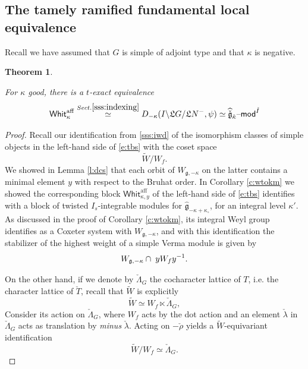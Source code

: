 \documentclass[11pt,reqno]{amsart}
\newcommand{\cgk}{\widehat{\check{\mathfrak{g}}}_{\check{\kappa}}}
\newcommand{\aff}{\operatorname{aff}}
\newcommand{\fL}{\mathfrak{L}}
\newcommand{\fg}{\mathfrak{g}}
\newtheorem{theo}[subsubsection]{Theorem}
\theoremstyle{remark}
\numberwithin{equation}{section}
\renewcommand{\mod}{\text{\textendash}\mathsf{mod}}
\newcommand{\Whit}{\mathsf{Whit}}
\begin{document}
\subsection{The tamely ramified fundamental local equivalence}
Recall we have assumed that $G$ is simple of adjoint type and that $\kappa$ is negative. 
\begin{theo}\label{t:fle-tame} 

For $\kappa$ good, there is a $t$-exact equivalence
	\begin{equation} \label{e:tbs} 
	\Whit_{\kappa}^{\aff} 
	\overset{Sect. \ref{sss:indexing}}{\simeq} 
	D_{-\kappa}(I \backslash \fL G / 
	\fL N^-, \psi) \simeq 
	\cgk\mod^{\check{I}} 
	\end{equation}
	\end{theo}
\begin{proof} Recall 
	our identification from \ref{sss:iwd} of the 
	isomorphism classes of simple objects in the left-hand side of 
	\eqref{e:tbs} with the coset 
	space
	\[ \widetilde{W} / W_f. \]
	We showed in Lemma \ref{l:dcs} that each orbit of $W_{\fg, -\kappa}$ on the 
	latter contains a minimal 
	element $y$ with respect to the Bruhat order. In Corollary \ref{c:wtokm} we 
	showed
	the corresponding block $\Whit_{\kappa, y}^{\aff}$ of the left-hand side 
	of \eqref{e:tbs} identifies
	with a block of twisted $I_s$-integrable modules for 
	$\widehat{\fg}_{-\kappa + 
	\kappa_\circ}$, for an integral level $\kappa'$. 
	As discussed in the proof of Corollary \ref{c:wtokm}, its integral Weyl 
	group 
	identifies as a Coxeter system with 
	$W_{\fg, -\kappa}$, and with this identification the stabilizer of the 
	highest 
	weight of a simple Verma module is given by 
	\begin{equation} \label{e:dada} W_{\fg, -\kappa} \cap \hspace{1mm} y W_f 
	y^{-1}.\end{equation}
	
	On the other hand, if we denote by $\check{\Lambda}_G$ the cocharacter 
	lattice of 
	$T$, 
	i.e. the character lattice of $\check{T}$, recall that $\widetilde{W}$ is 
	explicitly 
	\[ \widetilde{W} \simeq W_f \ltimes \check{\Lambda}_G,
	\]
	Consider its action on $\check{\Lambda}_G$, where $W_f$ acts by the dot 
	action 
	and an element $\check{\lambda}$ in $\check{\Lambda}_G$ acts as translation 
	by 
	{\em minus} $\check{\lambda}$. Acting on $-\check{\rho}$ yields a 
	$\widetilde{W}$-equivariant identification 
	\begin{equation} \label{e:sgn} \widetilde{W}/W_f \simeq \check{\Lambda}_G.
	\end{equation}
	

\end{proof}
\end{document}
